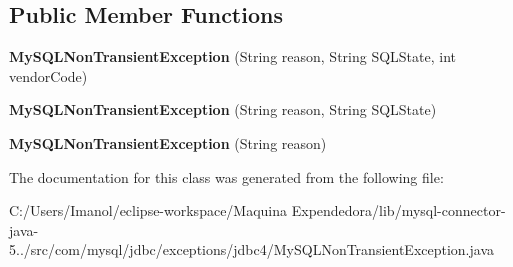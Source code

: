 \subsection*{Public Member Functions}
\begin{DoxyCompactItemize}
\item 
\mbox{\label{classcom_1_1mysql_1_1jdbc_1_1exceptions_1_1jdbc4_1_1_my_s_q_l_non_transient_exception_a2b55a34aa24bf928631f645e089bfeaa}} 
{\bfseries My\+S\+Q\+L\+Non\+Transient\+Exception} (String reason, String S\+Q\+L\+State, int vendor\+Code)
\item 
\mbox{\label{classcom_1_1mysql_1_1jdbc_1_1exceptions_1_1jdbc4_1_1_my_s_q_l_non_transient_exception_a33ff91f661edfee66768b56adea92a6f}} 
{\bfseries My\+S\+Q\+L\+Non\+Transient\+Exception} (String reason, String S\+Q\+L\+State)
\item 
\mbox{\label{classcom_1_1mysql_1_1jdbc_1_1exceptions_1_1jdbc4_1_1_my_s_q_l_non_transient_exception_a609d6c54ca0975b820d5ac40b8681638}} 
{\bfseries My\+S\+Q\+L\+Non\+Transient\+Exception} (String reason)
\end{DoxyCompactItemize}


The documentation for this class was generated from the following file\+:\begin{DoxyCompactItemize}
\item 
C\+:/\+Users/\+Imanol/eclipse-\/workspace/\+Maquina Expendedora/lib/mysql-\/connector-\/java-\/5../src/com/mysql/jdbc/exceptions/jdbc4/My\+S\+Q\+L\+Non\+Transient\+Exception.\+java\end{DoxyCompactItemize}

